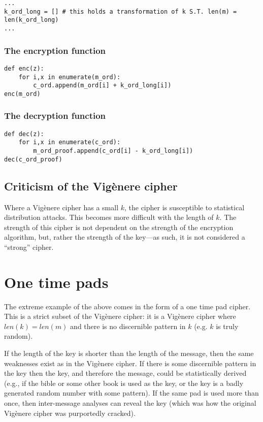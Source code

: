 \documentclass{AIAA}
\begin{document}
\begin{verbatim}
...
k_ord_long = [] # this holds a transformation of k S.T. len(m) = len(k_ord_long)
...
\end{verbatim}

\subsubsection{The encryption function}

\begin{verbatim}
def enc(z):
    for i,x in enumerate(m_ord):
        c_ord.append(m_ord[i] + k_ord_long[i])
enc(m_ord)
\end{verbatim}

\subsubsection{The decryption function}

\begin{verbatim}
def dec(z):
    for i,x in enumerate(c_ord):
        m_ord_proof.append(c_ord[i] - k_ord_long[i])
dec(c_ord_proof)
\end{verbatim}

\subsection{Criticism of the Vig\`enere cipher}
Where a Vig\`enere cipher has a small $k$, the cipher is susceptible to statistical distribution attacks. This becomes more difficult with the length of $k$. The strength of this cipher is not dependent on the strength of the encryption algorithm, but, rather the strength of the key---as such, it is not considered a ``strong'' cipher.

\section{One time pads}
The extreme example of the above comes in the form of a one time pad cipher. This is a strict subset of the Vig\`enere cipher: it is a Vig\`enere cipher where $len(k) = len(m)$ and there is no discernible pattern in $k$ (e.g. $k$ is truly random).

If the length of the key is shorter than the length of the message, then the same weaknesses exist as in the Vig\`enere cipher. If there is some discernible pattern in the key then the key, and therefore the message, could be statistically derived (e.g., if the bible or some other book is used as the key, or the key is a badly generated random number with some pattern). If the same pad is used more than once, then inter-message analyses can reveal the key (which was how the original Vig\`enere cipher was purportedly cracked).
\end{document}

